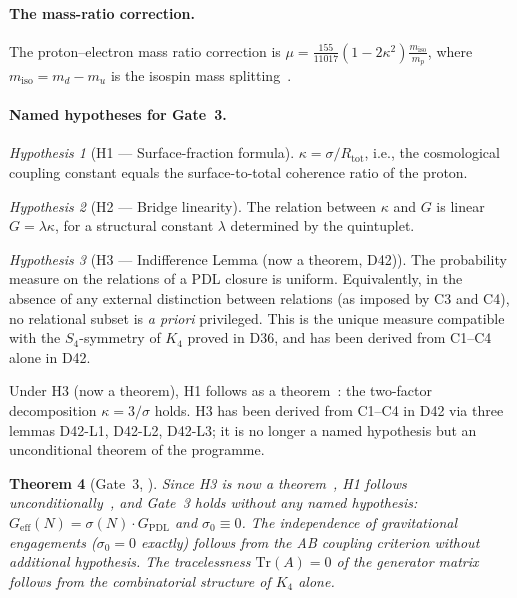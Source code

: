 \documentclass[11pt,a4paper]{article}
\theoremstyle{plain}
\newtheorem{theorem}{Theorem}[section]
\theoremstyle{definition}
\theoremstyle{remark}
\newtheorem{hypothesis}[theorem]{Hypothesis}
\newcommand{\Geff}{G_{\mathrm{eff}}}
\newcommand{\GPDL}{G_{\mathrm{PDL}}}
\newcommand{\sigmaN}{\sigma(N)}
\begin{document}
\paragraph{The mass-ratio correction.} The proton--electron mass ratio correction is $\mu=\frac{155}{11017}(1-2\kappa^2)\frac{m_{\mathrm{iso}}}{m_p}$, where $m_{\mathrm{iso}}=m_d-m_u$ is the isospin mass splitting~\cite{D28}.

\paragraph{Named hypotheses for Gate~3.}
\begin{hypothesis}[H1 --- Surface-fraction formula]
$\kappa=\sigma/R_{\mathrm{tot}}$, i.e., the cosmological coupling constant equals the surface-to-total coherence ratio of the proton.
\end{hypothesis}
\begin{hypothesis}[H2 --- Bridge linearity]
The relation between $\kappa$ and $G$ is linear $G=\lambda\kappa$, for a structural constant $\lambda$ determined by the quintuplet.
\end{hypothesis}
\begin{hypothesis}[H3 --- Indifference Lemma \textcolor{proofblue}{(now a theorem, D42)}]
The probability measure on the relations of a PDL closure is uniform. Equivalently, in the absence of any external distinction between relations (as imposed by C3 and C4), no relational subset is \emph{a priori} privileged. This is the unique measure compatible with the $S_4$-symmetry of $K_4$ proved in D36, and has been derived from C1--C4 alone in D42.
\end{hypothesis}

Under H3 (now a theorem), H1 follows as a theorem~\cite{D39}: the two-factor decomposition $\kappa=3/\sigma$ holds. H3 has been derived from C1--C4 in D42 via three lemmas D42-L1, D42-L2, D42-L3; it is no longer a named hypothesis but an unconditional theorem of the programme.

\begin{theorem}[Gate~3, \cite{D36}]
\label{thm:Gate3}
Since H3 is now a theorem~\cite{D42}, H1 follows unconditionally~\cite{D39}, and Gate~3 holds without any named hypothesis: $\Geff(N)=\sigmaN\cdot\GPDL$ and $\sigma_0\equiv 0$. The independence of gravitational engagements ($\sigma_0=0$ exactly) follows from the AB coupling criterion without additional hypothesis. The tracelessness $\mathrm{Tr}(A)=0$ of the generator matrix follows from the combinatorial structure of $K_4$ alone.
\end{theorem}
\end{document}
